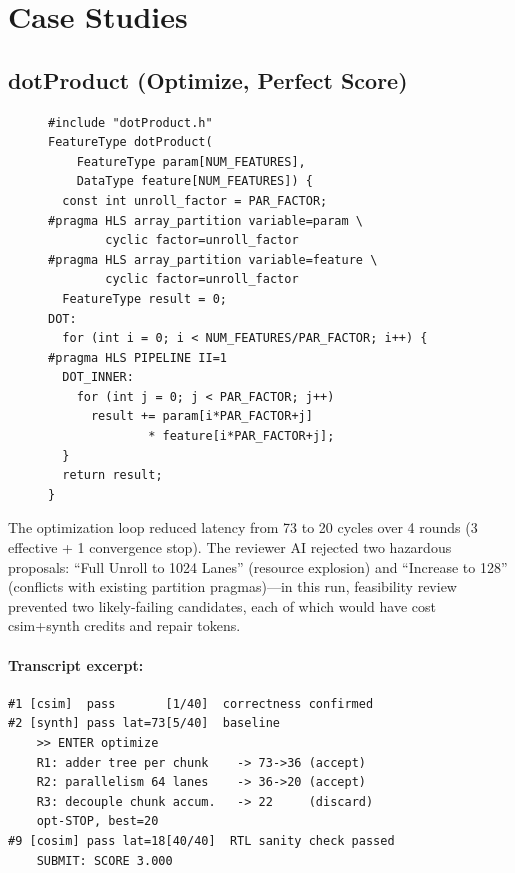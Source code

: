 \documentclass[10pt,conference,letterpaper]{IEEEtran}
\begin{document}
\section{Case Studies}
\label{app:cases}

\subsection{dotProduct (Optimize, Perfect Score)}

\begin{figure}[t]
\centering
\begin{lstlisting}[caption={Optimized dotProduct kernel: cyclic array partition + pipelined tiled loop (51.35$\times$ acceleration).},label={lst:dotproduct}]
#include "dotProduct.h"
FeatureType dotProduct(
    FeatureType param[NUM_FEATURES],
    DataType feature[NUM_FEATURES]) {
  const int unroll_factor = PAR_FACTOR;
#pragma HLS array_partition variable=param \
        cyclic factor=unroll_factor
#pragma HLS array_partition variable=feature \
        cyclic factor=unroll_factor
  FeatureType result = 0;
DOT:
  for (int i = 0; i < NUM_FEATURES/PAR_FACTOR; i++) {
#pragma HLS PIPELINE II=1
  DOT_INNER:
    for (int j = 0; j < PAR_FACTOR; j++)
      result += param[i*PAR_FACTOR+j]
              * feature[i*PAR_FACTOR+j];
  }
  return result;
}
\end{lstlisting}
\end{figure}

The optimization loop reduced latency from 73 to 20 cycles over 4 rounds (3 effective + 1 convergence stop). The reviewer AI rejected two hazardous proposals: ``Full Unroll to 1024 Lanes'' (resource explosion) and ``Increase to 128'' (conflicts with existing partition pragmas)---in this run, feasibility review prevented two likely-failing candidates, each of which would have cost csim+synth credits and repair tokens.

\paragraph{Transcript excerpt:}
\begin{footnotesize}
\begin{verbatim}
#1 [csim]  pass       [1/40]  correctness confirmed
#2 [synth] pass lat=73[5/40]  baseline
    >> ENTER optimize
    R1: adder tree per chunk    -> 73->36 (accept)
    R2: parallelism 64 lanes    -> 36->20 (accept)
    R3: decouple chunk accum.   -> 22     (discard)
    opt-STOP, best=20
#9 [cosim] pass lat=18[40/40]  RTL sanity check passed
    SUBMIT: SCORE 3.000
\end{verbatim}
\end{footnotesize}
\end{document}
